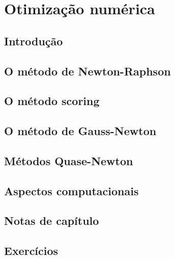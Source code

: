 \documentclass[
]{latex/krantz}
\theoremstyle{definition}
\theoremstyle{definition}
\theoremstyle{definition}
\theoremstyle{definition}
\theoremstyle{remark}
\begin{document}
\hypertarget{appendix-apuxeandices}{%
\appendix {}}


\hypertarget{otimizauxe7uxe3o-numuxe9rica}{%
\chapter{Otimização numérica}\label{otimizauxe7uxe3o-numuxe9rica}}

\hypertarget{introduuxe7uxe3o-13}{%
\section{Introdução}\label{introduuxe7uxe3o-13}}

\hypertarget{o-muxe9todo-de-newton-raphson}{%
\section{O método de Newton-Raphson}\label{o-muxe9todo-de-newton-raphson}}

\hypertarget{o-muxe9todo-scoring}{%
\section{O método scoring}\label{o-muxe9todo-scoring}}

\hypertarget{o-muxe9todo-de-gauss-newton}{%
\section{O método de Gauss-Newton}\label{o-muxe9todo-de-gauss-newton}}

\hypertarget{muxe9todos-quase-newton}{%
\section{Métodos Quase-Newton}\label{muxe9todos-quase-newton}}

\hypertarget{aspectos-computacionais}{%
\section{Aspectos computacionais}\label{aspectos-computacionais}}

\hypertarget{notas-de-capuxedtulo-13}{%
\section{Notas de capítulo}\label{notas-de-capuxedtulo-13}}

\hypertarget{exercuxedcios-13}{%
\section{Exercícios}\label{exercuxedcios-13}}
\end{document}

